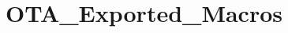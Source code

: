 \hypertarget{group___o_t_a___exported___macros}{}\section{O\+T\+A\+\_\+\+Exported\+\_\+\+Macros}
\label{group___o_t_a___exported___macros}
